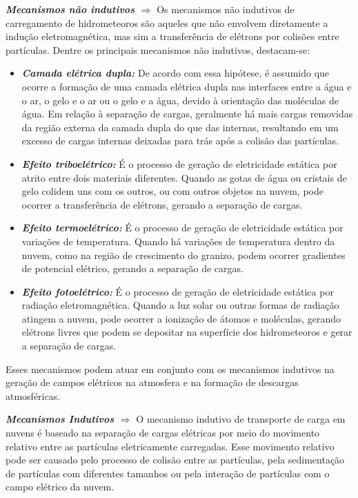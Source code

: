 \documentclass[a4paper, 12pt, onecolumn,singlespacing]{article}
\begin{document}
\begin{itemize}
		\subitem \textbf{\textit{Mecanismos não indutivos $\Rightarrow$}} Os mecanismos não indutivos de carregamento de hidrometeoros são aqueles que não envolvem diretamente a indução eletromagnética, mas sim a transferência de elétrons por colisões entre partículas. Dentre os principais mecanismos não indutivos, destacam-se:
		\begin{itemize}
			
			\item \textbf{\textit{Camada elétrica dupla: }}De acordo com essa hipótese, é assumido que ocorre a formação de uma camada elétrica dupla nas interfaces entre a água e o ar, o gelo e o ar ou o gelo e a água, devido à orientação das moléculas de água. Em relação à separação de cargas, geralmente há mais cargas removidas da região externa da camada dupla do que das internas, resultando em um excesso de cargas internas deixadas para trás após a colisão das partículas.
			
			\item \textbf{\textit{Efeito triboelétrico:}} É o processo de geração de eletricidade estática por atrito entre dois materiais diferentes. Quando as gotas de água ou cristais de gelo colidem uns com os outros, ou com outros objetos na nuvem, pode ocorrer a transferência de elétrons, gerando a separação de cargas.
			
			\item \textbf{\textit{Efeito termoelétrico:}} É o processo de geração de eletricidade estática por variações de temperatura. Quando há variações de temperatura dentro da nuvem, como na região de crescimento do granizo, podem ocorrer gradientes de potencial elétrico, gerando a separação de cargas.
			
			\item \textbf{\textit{Efeito fotoelétrico:}} É o processo de geração de eletricidade estática por radiação eletromagnética. Quando a luz solar ou outras formas de radiação atingem a nuvem, pode ocorrer a ionização de átomos e moléculas, gerando elétrons livres que podem se depositar na superfície dos hidrometeoros e gerar a separação de cargas.
		\end{itemize}

		
		Esses mecanismos podem atuar em conjunto com os mecanismos indutivos na geração de campos elétricos na atmosfera e na formação de descargas atmosféricas.
		
		\subitem \textbf{\textit{Mecanismos Indutivos $\Rightarrow$ }}O mecanismo indutivo de transporte de carga em nuvens é baseado na separação de cargas elétricas por meio do movimento relativo entre as partículas eletricamente carregadas. Esse movimento relativo pode ser causado pelo processo de colisão entre as partículas, pela sedimentação de partículas com diferentes tamanhos ou pela interação de partículas com o campo elétrico da nuvem.
		

\end{itemize}
\end{document}
